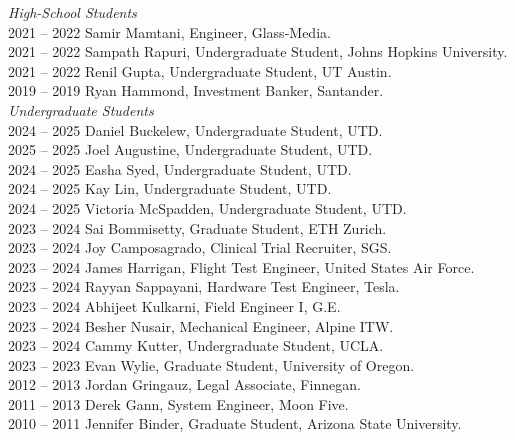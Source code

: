 
\textit{High-School Students} \\
2021 -- 2022 \hspace{28pt} Samir Mamtani, Engineer, Glass-Media. \\
2021 -- 2022 \hspace{28pt} Sampath Rapuri, Undergraduate Student, Johns Hopkins University. \\
2021 -- 2022 \hspace{28pt} Renil Gupta, Undergraduate Student, UT Austin. \\
2019 -- 2019 \hspace{28pt} Ryan Hammond, Investment Banker, Santander. \\

\textit{Undergraduate Students} \\
2024 -- 2025 \hspace{28pt} Daniel Buckelew, Undergraduate Student, UTD. \\
2025 -- 2025 \hspace{28pt} Joel Augustine, Undergraduate Student, UTD. \\
2024 -- 2025 \hspace{28pt} Easha Syed, Undergraduate Student, UTD. \\
2024 -- 2025 \hspace{28pt} Kay Lin, Undergraduate Student, UTD. \\
2024 -- 2025 \hspace{28pt} Victoria McSpadden, Undergraduate Student, UTD. \\
2023 -- 2024 \hspace{28pt} Sai Bommisetty, Graduate Student, ETH Zurich. \\
2023 -- 2024 \hspace{28pt} Joy Camposagrado, Clinical Trial Recruiter, SGS. \\
2023 -- 2024 \hspace{28pt} James Harrigan, Flight Test Engineer, United States Air Force. \\
2023 -- 2024 \hspace{28pt} Rayyan Sappayani, Hardware Test Engineer, Tesla. \\
2023 -- 2024 \hspace{28pt} Abhijeet Kulkarni, Field Engineer I, G.E. \\
2023 -- 2024 \hspace{28pt} Besher Nusair, Mechanical Engineer, Alpine ITW. \\
2023 -- 2024 \hspace{28pt} Cammy Kutter, Undergraduate Student, UCLA. \\
2023 -- 2023 \hspace{28pt} Evan Wylie, Graduate Student, University of Oregon. \\
2012 -- 2013 \hspace{28pt} Jordan Gringauz, Legal Associate, Finnegan. \\
2011 -- 2013 \hspace{28pt} Derek Gann, System Engineer, Moon Five. \\
2010 -- 2011 \hspace{28pt} Jennifer Binder, Graduate Student, Arizona State University. \\

